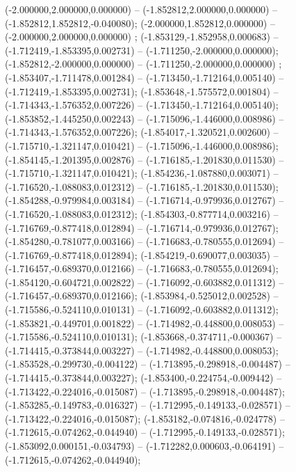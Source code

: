  (-2.000000,2.000000,0.000000) -- (-1.852812,2.000000,0.000000) -- (-1.852812,1.852812,-0.040080);
 (-2.000000,1.852812,0.000000) -- (-2.000000,2.000000,0.000000) ;
 (-1.853129,-1.852958,0.000683) -- (-1.712419,-1.853395,0.002731) -- (-1.711250,-2.000000,0.000000);
 (-1.852812,-2.000000,0.000000) -- (-1.711250,-2.000000,0.000000) ;
 (-1.853407,-1.711478,0.001284) -- (-1.713450,-1.712164,0.005140) -- (-1.712419,-1.853395,0.002731);
 (-1.853648,-1.575572,0.001804) -- (-1.714343,-1.576352,0.007226) -- (-1.713450,-1.712164,0.005140);
 (-1.853852,-1.445250,0.002243) -- (-1.715096,-1.446000,0.008986) -- (-1.714343,-1.576352,0.007226);
 (-1.854017,-1.320521,0.002600) -- (-1.715710,-1.321147,0.010421) -- (-1.715096,-1.446000,0.008986);
 (-1.854145,-1.201395,0.002876) -- (-1.716185,-1.201830,0.011530) -- (-1.715710,-1.321147,0.010421);
 (-1.854236,-1.087880,0.003071) -- (-1.716520,-1.088083,0.012312) -- (-1.716185,-1.201830,0.011530);
 (-1.854288,-0.979984,0.003184) -- (-1.716714,-0.979936,0.012767) -- (-1.716520,-1.088083,0.012312);
 (-1.854303,-0.877714,0.003216) -- (-1.716769,-0.877418,0.012894) -- (-1.716714,-0.979936,0.012767);
 (-1.854280,-0.781077,0.003166) -- (-1.716683,-0.780555,0.012694) -- (-1.716769,-0.877418,0.012894);
 (-1.854219,-0.690077,0.003035) -- (-1.716457,-0.689370,0.012166) -- (-1.716683,-0.780555,0.012694);
 (-1.854120,-0.604721,0.002822) -- (-1.716092,-0.603882,0.011312) -- (-1.716457,-0.689370,0.012166);
 (-1.853984,-0.525012,0.002528) -- (-1.715586,-0.524110,0.010131) -- (-1.716092,-0.603882,0.011312);
 (-1.853821,-0.449701,0.001822) -- (-1.714982,-0.448800,0.008053) -- (-1.715586,-0.524110,0.010131);
 (-1.853668,-0.374711,-0.000367) -- (-1.714415,-0.373844,0.003227) -- (-1.714982,-0.448800,0.008053);
 (-1.853528,-0.299730,-0.004122) -- (-1.713895,-0.298918,-0.004487) -- (-1.714415,-0.373844,0.003227);
 (-1.853400,-0.224754,-0.009442) -- (-1.713422,-0.224016,-0.015087) -- (-1.713895,-0.298918,-0.004487);
 (-1.853285,-0.149783,-0.016327) -- (-1.712995,-0.149133,-0.028571) -- (-1.713422,-0.224016,-0.015087);
 (-1.853182,-0.074816,-0.024778) -- (-1.712615,-0.074262,-0.044940) -- (-1.712995,-0.149133,-0.028571);
 (-1.853092,0.000151,-0.034793) -- (-1.712282,0.000603,-0.064191) -- (-1.712615,-0.074262,-0.044940);

